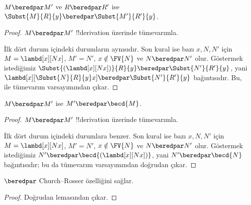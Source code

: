 \begin{lem}
  $M \beredpar M'$ ve $R \beredpar R'$ ise $\Subst{M}{R}{y}
  \beredpar \Subst{M'}{R'}{y}$.
\end{lem}

\begin{proof}
  $M \beredpar M'$ !!{derivation} üzerinde tümevarımla.

  İlk dört durum  içindeki durumların aynısıdır. Son kural
   ise bazı $x,N,N'$ için
  $M=\lambd[x][Nx]$, $M'=N'$, $x\notin\FV{N}$ ve $N\beredpar N'$ olur.
  Göstermek istediğimiz
  $\Subst{(\lambd[x][Nx])}{R}{y}\beredpar\Subst{N'}{R'}{y}$, yani
  $\lambd[x][\Subst{N}{R}{y}x]\beredpar\Subst{N'}{R'}{y}$ bağıntısıdır.
  Bu,  ile tümevarım
  varsayımından çıkar.
\end{proof}

\begin{lem}
  $M \beredpar M'$ ise $M' \beredpar \becd{M}$.
\end{lem}

\begin{proof}
  $M \beredpar M'$ !!{derivation} üzerinde tümevarımla.

  İlk dört durum  içindeki durumlara benzer. Son kural
   ise bazı $x,N,N'$ için
  $M=\lambd[x][Nx]$, $M'=N'$, $x\notin\FV{N}$ ve $N\beredpar N'$ olur.
  Göstermek istediğimiz $N'\beredpar\becd{(\lambd[x][Nx])}$, yani
  $N'\beredpar\becd{N}$ bağıntısıdır; bu da tümevarım varsayımından doğrudan
  çıkar.
\end{proof}

\begin{thm}
  $\beredpar$ Church--Rosser özelliğini sağlar.
\end{thm}

\begin{proof}
  Doğrudan  lemasından çıkar.
\end{proof}

